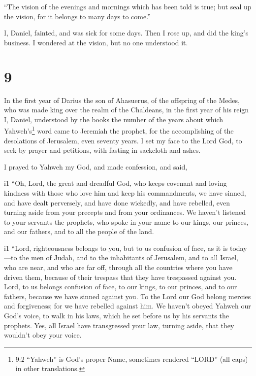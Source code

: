  ``The vision of the evenings and mornings which has been
told is true; but seal up the vision, for it belongs to many days to
come.''

 I, Daniel, fainted, and was sick for some days. Then I
rose up, and did the king's business. I wondered at the vision, but no
one understood it.

\hypertarget{section-8}{%
\section{9}\label{section-8}}

 In the first year of Darius the son of Ahasuerus, of the
offspring of the Medes, who was made king over the realm of the
Chaldeans,  in the first year of his reign I, Daniel,
understood by the books the number of the years about which
Yahweh's\footnote{9:2 ``Yahweh'' is God's proper Name, sometimes
  rendered ``LORD'' (all caps) in other translations.} word came to
Jeremiah the prophet, for the accomplishing of the desolations of
Jerusalem, even seventy years.  I set my face to the Lord
God, to seek by prayer and petitions, with fasting in sackcloth and
ashes.

 I prayed to Yahweh my God, and made confession, and said,

i1 ``Oh, Lord, the great and dreadful God, who keeps covenant and loving
kindness with those who love him and keep his commandments, 
we have sinned, and have dealt perversely, and have done wickedly, and
have rebelled, even turning aside from your precepts and from your
ordinances.  We haven't listened to your servants the
prophets, who spoke in your name to our kings, our princes, and our
fathers, and to all the people of the land.

i1 ``Lord, righteousness belongs to you, but to us confusion
of face, as it is today---to the men of Judah, and to the inhabitants of
Jerusalem, and to all Israel, who are near, and who are far off, through
all the countries where you have driven them, because of their trespass
that they have trespassed against you.  Lord, to us belongs
confusion of face, to our kings, to our princes, and to our fathers,
because we have sinned against you.  To the Lord our God
belong mercies and forgiveness; for we have rebelled against him.
 We haven't obeyed Yahweh our God's voice, to walk in his
laws, which he set before us by his servants the prophets. 
Yes, all Israel have transgressed your law, turning aside, that they
wouldn't obey your voice.

